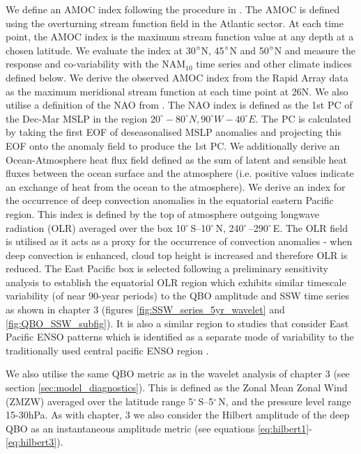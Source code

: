 We define an AMOC index following the procedure in \cite{reichlerStratospheric2012b}. The AMOC is defined using the overturning stream function field in the Atlantic sector. At each time point, the AMOC index is the maximum stream function value at any depth at a chosen latitude. We evaluate the index at 30$\degree$N, 45$\degree$N and 50$\degree$N and measure the response and co-variability with the NAM$_{10}$ time series and other climate indices defined below. We derive the observed AMOC index from the Rapid Array data as the maximum meridional stream function at each time point at 26N. We also utilise a definition of the NAO from \cite{hurrellNorth2003c}. The NAO index is defined as the 1st PC of the Dec-Mar MSLP in the region $20^{\circ}-80^{\circ}N, 90^{\circ}W-40^{\circ}E$. The PC is calculated by taking the first EOF of deseasonalised MSLP anomalies and projecting this EOF onto the anomaly field to produce the 1st PC. We additionally derive an Ocean-Atmosphere heat flux field defined as the sum of latent and sensible heat fluxes between the ocean surface and the atmosphere (i.e. positive values indicate an exchange of heat from the ocean to the atmosphere). We derive an index for the occurrence of deep convection anomalies in the equatorial eastern Pacific region. This index is defined by the top of atmosphere outgoing longwave radiation (OLR) averaged over the box 10$^{\circ}$\,S–10$^{\circ}$\,N, 240$^{\circ}$\,–290$^{\circ}$\,E. The OLR field is utilised as it acts as a proxy for the occurrence of convection anomalies - when deep convection is enhanced, cloud top height is increased and therefore OLR is reduced. The East Pacific box is selected following a preliminary sensitivity analysis to establish the equatorial OLR region which exhibits similar timescale variability (of near 90-year periods) to the QBO amplitude and SSW time series as shown in chapter 3 (figures \ref{fig:SSW_series_5yr_wavelet} and \ref{fig:QBO_SSW_subfig}). It is also a similar region to studies that consider East Pacific ENSO patterns which is identified as a separate mode of variability to the traditionally used central pacific ENSO region \citep{johnsonHow2013f}.

We also utilise the same QBO metric as in the wavelet analysis of chapter 3 (see section \ref{sec:model_diagnostics}). This is defined as the Zonal Mean Zonal Wind (ZMZW) averaged over the latitude range 5$^{\circ}$\,S–5$^{\circ}$\,N,  and the pressure level range 15-30hPa. As with chapter, 3 we also consider the Hilbert amplitude of the deep QBO as an instantaneous amplitude metric (see equations \ref{eq:hilbert1}-\ref{eq:hilbert3}). 

